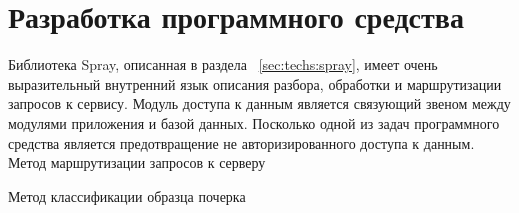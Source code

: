\section{Разработка программного средства}
Библиотека Spray, описанная в раздела ~\ref{sec:techs:spray}, имеет очень выразительный внутренний язык описания разбора, обработки и маршрутизации запросов к сервису. Модуль доступа к данным является связующий звеном между модулями приложения и базой данных. Посколько одной из задач программного средства является предотвращение не авторизированного доступа к данным.
Метод маршрутизации запросов к серверу


Метод классификации образца почерка 
